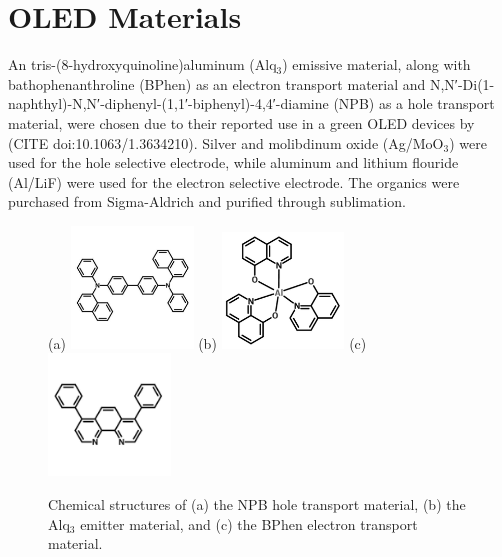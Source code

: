 \documentclass{report}
\begin{document}
    \section{OLED Materials} \label{materials}
    An tris-(8-hydroxyquinoline)aluminum (Alq$_3$) emissive material, along with bathophenanthroline (BPhen) as an electron transport material and N,N′-Di(1-naphthyl)-N,N′-diphenyl-(1,1′-biphenyl)-4,4′-diamine (NPB) as a hole transport material, were chosen due to their reported use in a green OLED devices by (CITE doi:10.1063/1.3634210). Silver and molibdinum oxide (Ag/MoO$_3$) were used for the hole selective electrode, while aluminum and lithium flouride (Al/LiF) were used for the electron selective electrode. The organics were purchased from Sigma-Aldrich and purified through sublimation.\\
    \begin{figure}[h!]
        \centering
        (a)
        \includegraphics[width=0.29\textwidth]{images/npb_structure.jpg}
        (b)
        \includegraphics[width=0.29\textwidth]{images/alq3_structure.png}
        (c)
        \includegraphics[width=0.29\textwidth]{images/bphen_structure.jpg}
        \caption{Chemical structures of (a) the NPB hole transport material, (b) the Alq$_3$ emitter material, and (c) the BPhen electron transport material.}
        \label{fig:structures}
    \end{figure}
    \newpage
\end{document}

